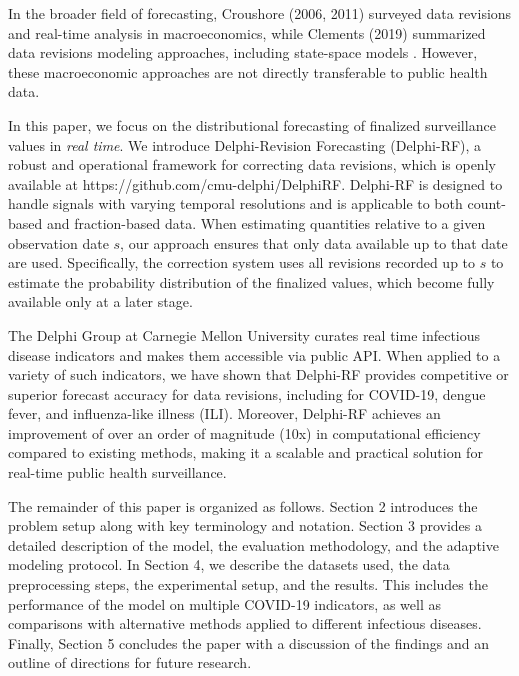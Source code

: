 In the broader field of forecasting, Croushore (2006, 2011) surveyed data revisions and real-time analysis in macroeconomics, while Clements (2019) summarized data revisions modeling approaches, including state-space models \cite{croushore2006forecasting} \cite{croushore2011forecasting} \cite{clements2019data}. However, these macroeconomic approaches are not directly transferable to public health data.

In this paper, we focus on the distributional forecasting of finalized surveillance values in \textit{real time}. We introduce Delphi-Revision Forecasting (Delphi-RF), a robust and operational framework for correcting data revisions, which is openly available at https://github.com/cmu-delphi/DelphiRF. Delphi-RF is designed to handle signals with varying temporal resolutions and is applicable to both count-based and fraction-based data. When estimating quantities relative to a given observation date $s$, our approach ensures that only data available up to that date are used. Specifically, the correction system uses all revisions recorded up to $s$ to estimate the probability distribution of the finalized values, which become fully available only at a later stage.

The Delphi Group at Carnegie Mellon University curates real time infectious disease indicators and makes them accessible via public API\cite{reinhart2021open}.  When applied to a variety of such indicators, we have shown that Delphi-RF provides competitive or superior forecast accuracy for data revisions, including for COVID-19, dengue fever, and influenza-like illness (ILI). Moreover, Delphi-RF achieves an improvement of over an order of magnitude (10x) in computational efficiency compared to existing methods, making it a scalable and practical solution for real-time public health surveillance.

The remainder of this paper is organized as follows. Section 2 introduces the problem setup along with key terminology and notation. Section 3 provides a detailed description of the model, the evaluation methodology, and the adaptive modeling protocol. In Section 4, we describe the datasets used, the data preprocessing steps, the experimental setup, and the results. This includes the performance of the model on multiple COVID-19 indicators, as well as comparisons with alternative methods applied to different infectious diseases. Finally, Section 5 concludes the paper with a discussion of the findings and an outline of directions for future research.

